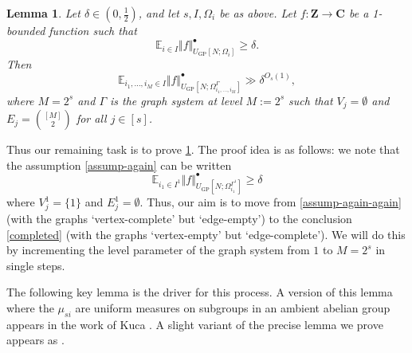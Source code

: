 \documentclass[11pt,reqno]{amsart}
\numberwithin{equation}{section}
\newtheorem{lemma}[theorem]{Lemma}
\theoremstyle{definition}
\theoremstyle{remark}
\newcommand{\mb}{\mathbb}
\renewcommand{\ge}{\geqslant}
\newcommand\Z{\mathbf{Z}}
\newcommand\C{\mathbf{C}}
\newcommand\E{\mb{E}}
\newcommand\GP{\operatorname{GP}}
\begin{document}
\begin{lemma}\label{main-concat-graph}
Let $\delta \in (0, \frac{1}{2})$, and let $s, I, \Omega_i$ be as above. Let $f : \Z \rightarrow \C$ be a 1-bounded function such that 
\begin{equation}\label{assump-again} \E_{i \in I} \Vert f \Vert^{\bullet}_{U_{\GP}[N; \Omega_i]} \ge \delta. \end{equation}
Then
\begin{equation}\label{completed} \E_{i_1,\dots, i_{M} \in I} \Vert f \Vert^{\bullet}_{U_{\GP}[N; \Omega^{\Gamma}_{i_1,\dots, i_{M}}]} \gg \delta^{O_s(1)}, \end{equation} 
where $M = 2^s$ and $\Gamma$ is the graph system at level $M := 2^s$ such that $V_j = \emptyset$ and $E_j = \binom{[M]}{2}$ for all $j \in [s]$.
\end{lemma}
Thus our remaining task is to prove \cref{main-concat-graph}. The proof idea is as follows: we note that the assumption \cref{assump-again} can be written 
\begin{equation}\label{assump-again-again} \E_{i_1 \in I^1} \Vert f \Vert^{\bullet}_{U_{\GP}[N; \Omega^{\Gamma^1}_{i_1}]} \ge \delta \end{equation} where $V^1_j = \{1\}$ and $E^1_j = \emptyset$. Thus, our aim is to move from \cref{assump-again-again} (with the graphs `vertex-complete' but `edge-empty') to the conclusion \cref{completed} (with the graphs `vertex-empty' but `edge-complete'). We will do this by incrementing the level parameter of the graph system from $1$ to $M = 2^s$ in single steps.

The following key lemma is the driver for this process. A version of this lemma where the $\mu_{si}$ are uniform measures on subgroups in an ambient abelian group appears in the work of Kuca \cite[Lemma~2.2]{kuca}. A slight variant of the precise lemma we prove appears as \cite[Lemma~6.1]{KKL24}. 
\end{document}
